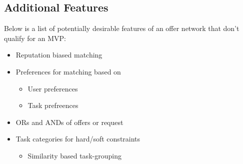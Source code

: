 \documentclass[main.tex]{subfiles}
\begin{document}
\subsection{Additional Features}

Below is a list of potentially desirable features of an offer network that don't qualify for an MVP:
\begin{itemize}
  \item Reputation biased matching
  \item Preferences for matching based on
    \begin{itemize}
      \item User preferences
      \item Task prefreences
    \end{itemize}
  \item ORs and ANDs of offers or request
  \item Task categories for hard/soft constraints
    \begin{itemize}
      \item Similarity based task-grouping
    \end{itemize}
\end{itemize}
\end{document}
